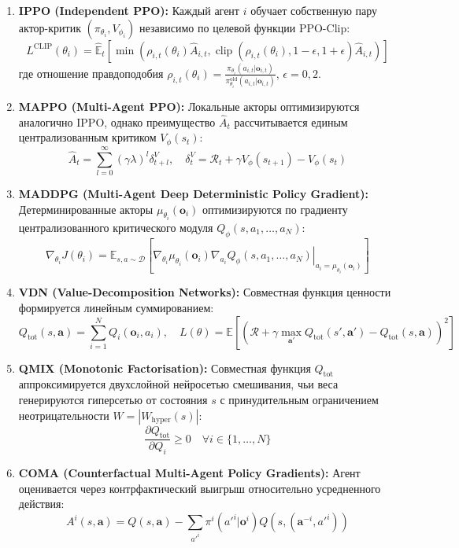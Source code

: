 \documentclass[11pt,a4paper]{article}
\begin{document}
\begin{enumerate}[leftmargin=*]
\item \textbf{IPPO (Independent PPO):} Каждый агент $i$ обучает собственную пару актор-критик $(\pi_{\theta_i}, V_{\phi_i})$ независимо по целевой функции PPO-Clip:
$$L^{\text{CLIP}}(\theta_i) = \hat{\mathbb{E}}_t \left[ \min\left( \rho_{i, t}(\theta_i) \hat{A}_{i, t}, \operatorname{clip}(\rho_{i, t}(\theta_i), 1-\epsilon, 1+\epsilon) \hat{A}_{i, t} \right) \right]$$
где отношение правдоподобия $\rho_{i, t}(\theta_i) = \frac{\pi_{\theta_i}(a_{i, t}|\mathbf{o}_{i, t})}{\pi_{\theta_i}^{\text{old}}(a_{i, t}|\mathbf{o}_{i, t})}$, $\epsilon = 0{,}2$.

\item \textbf{MAPPO (Multi-Agent PPO):} Локальные акторы оптимизируются аналогично IPPO, однако преимущество $\hat{A}_t$ рассчитывается единым централизованным критиком $V_\phi(s_t)$:
$$\hat{A}_t = \sum_{l=0}^{\infty} (\gamma \lambda)^l \delta_{t+l}^V, \quad \delta_t^V = \mathcal{R}_t + \gamma V_\phi(s_{t+1}) - V_\phi(s_t)$$

\item \textbf{MADDPG (Multi-Agent Deep Deterministic Policy Gradient):} Детерминированные акторы $\mu_{\theta_i}(\mathbf{o}_i)$ оптимизируются по градиенту централизованного критического модуля $Q_\phi(s, a_1, \dots, a_N)$:
$$\nabla_{\theta_i} J(\theta_i) = \mathbb{E}_{s, a \sim \mathcal{D}} \left[ \nabla_{\theta_i} \mu_{\theta_i}(\mathbf{o}_i) \left. \nabla_{a_i} Q_\phi(s, a_1, \dots, a_N) \right|_{a_i = \mu_{\theta_i}(\mathbf{o}_i)} \right]$$

\item \textbf{VDN (Value-Decomposition Networks):} Совместная функция ценности формируется линейным суммированием:
$$Q_{\text{tot}}(s, \mathbf{a}) = \sum_{i=1}^N Q_i(\mathbf{o}_i, a_i), \quad L(\theta) = \mathbb{E} \left[ \left( \mathcal{R} + \gamma \max_{\mathbf{a}'} Q_{\text{tot}}(s', \mathbf{a}') - Q_{\text{tot}}(s, \mathbf{a}) \right)^2 \right]$$

\item \textbf{QMIX (Monotonic Factorisation):} Совместная функция $Q_{\text{tot}}$ аппроксимируется двухслойной нейросетью смешивания, чьи веса генерируются гиперсетью от состояния $s$ с принудительным ограничением неотрицательности $W = |W_{\text{hyper}}(s)|$:
$$\frac{\partial Q_{\text{tot}}}{\partial Q_i} \ge 0 \quad \forall i \in \{1, \dots, N\}$$

\item \textbf{COMA (Counterfactual Multi-Agent Policy Gradients):} Агент оценивается через контрфактический выигрыш относительно усредненного действия:
$$A^i(s, \mathbf{a}) = Q(s, \mathbf{a}) - \sum_{a'^i} \pi^i(a'^i|\mathbf{o}^i) Q(s, (\mathbf{a}^{-i}, a'^i))$$


\end{enumerate}
\end{document}
